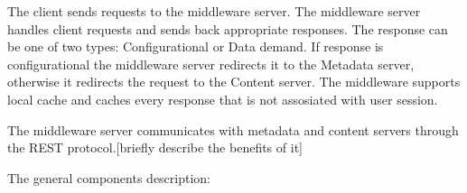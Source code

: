 The client sends requests to the middleware server. The middleware server handles client requests and sends back appropriate responses. The response can be one of two types: Configurational or Data demand. If response is configurational the middleware server redirects it to the Metadata server, otherwise it redirects the request to the Content server. The middleware supports local cache and caches every response that is not assosiated with user session.


The middleware server communicates with metadata and content servers through the REST protocol.[briefly describe the benefits of it]    

The general components description:




